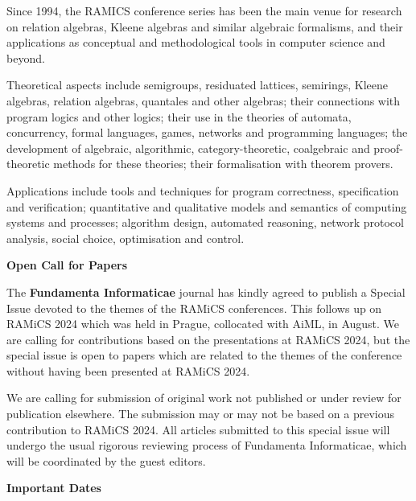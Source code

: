 \documentclass[a4paper, 11pt]{article}
\begin{document}
\begin{multicols}{2}
  Since 1994, the RAMICS conference series has been the main venue for
  research on relation algebras, Kleene algebras and similar algebraic
  formalisms, and their applications as conceptual and methodological
  tools in computer science and beyond.

  \medskip

  Theoretical aspects include semigroups, residuated lattices,
  semirings, Kleene algebras, relation algebras, quantales and other
  algebras; their connections with program logics and other logics;
  their use in the theories of automata, concurrency, formal
  languages, games, networks and programming languages; the
  development of algebraic, algorithmic, category-theoretic,
  coalgebraic and proof-theoretic methods for these theories; their
  formalisation with theorem provers.

  \medskip

  Applications include tools and techniques for program correctness,
  specification and verification; quantitative and qualitative models
  and semantics of computing systems and processes; algorithm design,
  automated reasoning, network protocol analysis, social choice,
  optimisation and control.

  \bigskip

  \hfill {\Large \bf Open Call for Papers}

  \medskip

  The \textbf{Fundamenta Informaticae} journal has kindly agreed to
  publish a Special Issue devoted to the themes of the RAMiCS
  conferences. This follows up on RAMiCS 2024 which was held in
  Prague, collocated with AiML, in August. We are calling for
  contributions based on the presentations at RAMiCS 2024, but the
  special issue is open to papers which are related to the themes of
  the conference without having been presented at RAMiCS 2024.

  We are calling for submission of original work not published or
  under review for publication elsewhere. The submission may or may
  not be based on a previous contribution to RAMiCS 2024. All articles
  submitted to this special issue will undergo the usual rigorous
  reviewing process of Fundamenta Informaticae, which will be
  coordinated by the guest editors.
  
  \bigskip
  
  \hfill {\Large \bf Important Dates}

  \medskip


\end{multicols}
\end{document}
